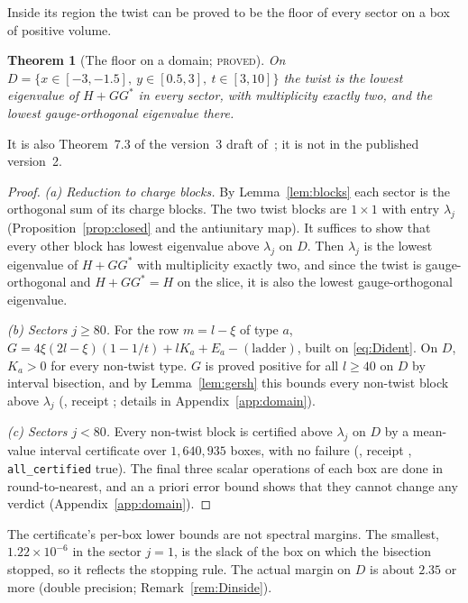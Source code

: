 \documentclass[11pt]{article}
\newtheorem{theorem}{Theorem}[section]
\theoremstyle{definition}
\theoremstyle{remark}
\newcommand{\PROVED}{\textsc{proved}}
\begin{document}
Inside its region the twist can be proved to be the floor of every sector on a box of positive volume.

\begin{theorem}[The floor on a domain; \PROVED]\label{thm:domain}
On $D=\{x\in[-3,-1.5],\ y\in[0.5,3],\ t\in[3,10]\}$ the twist is the lowest eigenvalue of $H+GG^*$ in every sector,
with multiplicity exactly two, and the lowest gauge-orthogonal eigenvalue there.
\end{theorem}

It is also Theorem~7.3 of the version~3 draft of~\cite{davisfloor2026}; it is not in the published version~2.

\begin{proof}
\emph{(a) Reduction to charge blocks.} By Lemma~\ref{lem:blocks} each sector is the orthogonal sum of its charge
blocks. The two twist blocks are $1\times1$ with entry $\lambda_j$ (Proposition~\ref{prop:closed} and the antiunitary
map). It suffices to show that every other block has lowest eigenvalue above $\lambda_j$ on $D$. Then $\lambda_j$ is the
lowest eigenvalue of $H+GG^*$ with multiplicity exactly two, and since the twist is gauge-orthogonal and $H+GG^*=H$ on
the slice, it is also the lowest gauge-orthogonal eigenvalue.

\emph{(b) Sectors $j\ge80$.} For the row $m=l-\xi$ of type $a$, $G=4\xi(2l-\xi)(1-1/t)+lK_a+E_a-(\text{ladder})$, built
on \eqref{eq:Dident}. On $D$, $K_a>0$ for every non-twist type. $G$ is proved positive for all $l\ge40$ on $D$ by
interval bisection, and by Lemma~\ref{lem:gersh} this bounds every non-twist block above $\lambda_j$
(, receipt ; details in Appendix~\ref{app:domain}).

\emph{(c) Sectors $j<80$.} Every non-twist block is certified above $\lambda_j$ on $D$ by a mean-value interval
certificate over $1{,}640{,}935$ boxes, with no failure (, receipt
, \texttt{all\_certified} true). The final three scalar operations of each box are
done in round-to-nearest, and an a priori error bound shows that they cannot change any verdict
(Appendix~\ref{app:domain}).
\end{proof}

The certificate's per-box lower bounds are not spectral margins. The smallest, $1.22\times10^{-6}$ in the sector $j=1$,
is the slack of the box on which the bisection stopped, so it reflects the stopping rule. The actual margin on $D$ is
about $2.35$ or more (double precision; Remark~\ref{rem:Dinside}).
\end{document}
